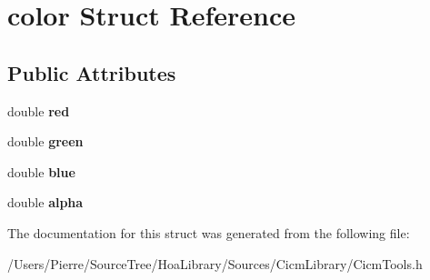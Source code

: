 \hypertarget{structcolor}{\section{color Struct Reference}
\label{structcolor}
}
\subsection*{Public Attributes}
\begin{DoxyCompactItemize}
\item 
\hypertarget{structcolor_afe953c8b917ddf09b245eaff9a313783}{double {\bfseries red}}\label{structcolor_afe953c8b917ddf09b245eaff9a313783}

\item 
\hypertarget{structcolor_ab980e144fe1a27008051450cb1a8ff5a}{double {\bfseries green}}\label{structcolor_ab980e144fe1a27008051450cb1a8ff5a}

\item 
\hypertarget{structcolor_aeb6f020a07fe188b49873253134a640d}{double {\bfseries blue}}\label{structcolor_aeb6f020a07fe188b49873253134a640d}

\item 
\hypertarget{structcolor_a5c9cc2f085e533b4f10b123b53868106}{double {\bfseries alpha}}\label{structcolor_a5c9cc2f085e533b4f10b123b53868106}

\end{DoxyCompactItemize}


The documentation for this struct was generated from the following file\-:\begin{DoxyCompactItemize}
\item 
/\-Users/\-Pierre/\-Source\-Tree/\-Hoa\-Library/\-Sources/\-Cicm\-Library/Cicm\-Tools.\-h\end{DoxyCompactItemize}
